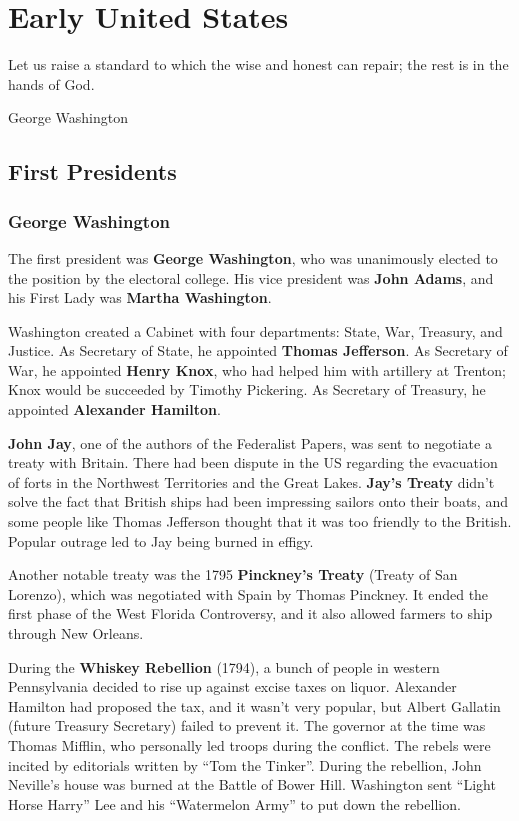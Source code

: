 \chapter{Early United States}

\epigraph{%
  Let us raise a standard to which the wise and honest can repair; the rest is in the hands of God.
}{George Washington}

\section{First Presidents}

\subsection*{George Washington}

The first president was \textbf{George Washington},
who was unanimously elected to the position by the electoral college.
His vice president was \textbf{John Adams},
and his First Lady was \textbf{Martha Washington}.

Washington created a Cabinet with four departments: State, War, Treasury, and Justice.
As Secretary of State, he appointed \textbf{Thomas Jefferson}.
As Secretary of War, he appointed \textbf{Henry Knox},
who had helped him with artillery at Trenton;
Knox would be succeeded by Timothy Pickering.
As Secretary of Treasury, he appointed \textbf{Alexander Hamilton}.

\textbf{John Jay}, one of the authors of the Federalist Papers, was sent to negotiate a treaty with Britain.
There had been dispute in the US regarding the evacuation of forts in the Northwest Territories and the Great Lakes.
\textbf{Jay's Treaty} didn't solve the fact that British ships had been impressing sailors onto their boats,
and some people like Thomas Jefferson thought that it was too friendly to the British.
Popular outrage led to Jay being burned in effigy.

Another notable treaty was the 1795 \textbf{Pinckney's Treaty} (Treaty of San Lorenzo),
which was negotiated with Spain by Thomas Pinckney.
It ended the first phase of the West Florida Controversy,
and it also allowed farmers to ship through New Orleans.

During the \textbf{Whiskey Rebellion} (1794),
a bunch of people in western Pennsylvania decided to rise up against excise taxes on liquor.
Alexander Hamilton had proposed the tax, and it wasn't very popular,
but Albert Gallatin (future Treasury Secretary) failed to prevent it.
The governor at the time was Thomas Mifflin, who personally led troops during the conflict.
The rebels were incited by editorials written by ``Tom the Tinker''.
During the rebellion, John Neville's house was burned at the Battle of Bower Hill.
Washington sent ``Light Horse Harry'' Lee and his ``Watermelon Army'' to put down the rebellion.

